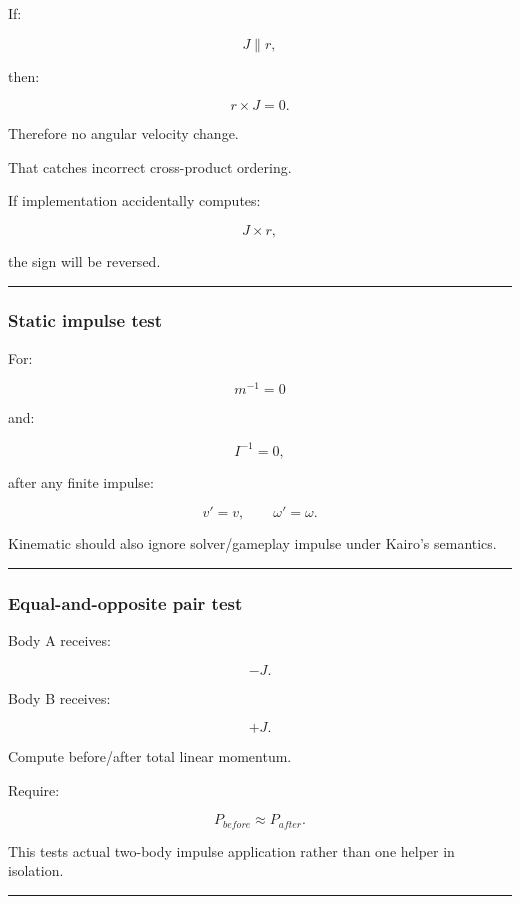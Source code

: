 If:

\[
J\parallel r,
\]

then:

\[
r\times J=0.
\]

Therefore no angular velocity change.

That catches incorrect cross-product ordering.

If implementation accidentally computes:

\[
J\times r,
\]

the sign will be reversed.

\begin{center}\rule{0.5\linewidth}{0.5pt}\end{center}

\subsubsection{Static impulse test}\label{static-impulse-test}

For:

\[
m^{-1}=0
\]

and:

\[
I^{-1}=0,
\]

after any finite impulse:

\[
v'=v,
\qquad
\omega'=\omega.
\]

Kinematic should also ignore solver/gameplay impulse under Kairo's semantics.

\begin{center}\rule{0.5\linewidth}{0.5pt}\end{center}

\subsubsection{Equal-and-opposite pair test}\label{equal-and-opposite-pair-test}

Body A receives:

\[
-J.
\]

Body B receives:

\[
+J.
\]

Compute before/after total linear momentum.

Require:

\[
\boxed{
P_{before}\approx P_{after}.
}
\]

This tests actual two-body impulse application rather than one helper in isolation.

\begin{center}\rule{0.5\linewidth}{0.5pt}\end{center}

